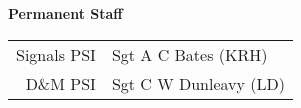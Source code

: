 \begin{center}
  \Large
  \textbf{Permanent Staff}
\end{center}

\begin{center}
  \small
  \begin{tabular}{rl}
    Signals PSI & Sgt A C Bates (KRH) \\
    D\&M PSI & Sgt C W Dunleavy (LD) \\
  \end{tabular}
\end{center}
